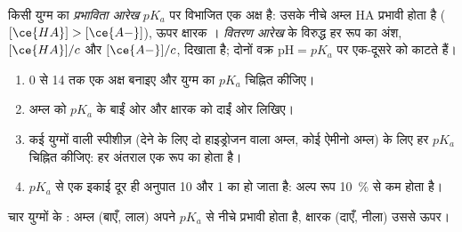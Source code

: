 \begin{definition}[प्रभाविता और वितरण आरेख]\label{def:g12:buffers-predominance:predominance}
किसी युग्म का \emph{प्रभाविता आरेख}
$pK_a$ पर विभाजित एक  अक्ष है: उसके नीचे अम्ल HA प्रभावी होता है
($[\ce{HA}] > [\ce{A-}]$), ऊपर क्षारक । \emph{वितरण
आरेख}  के विरुद्ध हर रूप का अंश,
$[\ce{HA}]/c$ और $[\ce{A-}]/c$, दिखाता है; दोनों वक्र
$\mathrm{pH} = pK_a$ पर एक-दूसरे को काटते हैं।
\end{definition}

\begin{method}[प्रभाविता आरेख बनाना]\label{met:g12:buffers-predominance:diagram}
\begin{enumerate}
  \item 0 से 14 तक एक  अक्ष बनाइए और युग्म का $pK_a$ चिह्नित कीजिए।
  \item अम्ल को $pK_a$ के बाईं ओर और क्षारक को दाईं ओर लिखिए।
  \item कई युग्मों वाली स्पीशीज़ (देने के लिए दो हाइड्रोजन वाला अम्ल,
        कोई ऐमीनो अम्ल) के लिए हर $pK_a$ चिह्नित कीजिए: हर अंतराल
        एक रूप का होता है।
  \item $pK_a$ से एक इकाई दूर ही अनुपात 10 और 1 का हो जाता है: अल्प
        रूप \qty{10}{\percent} से कम होता है।
\end{enumerate}
\end{method}

\begin{omfigure}

{\small चार युग्मों के : अम्ल (बाएँ, लाल) अपने $pK_a$ से नीचे
प्रभावी होता है, क्षारक (दाएँ, नीला) उससे ऊपर।}
\end{omfigure}

